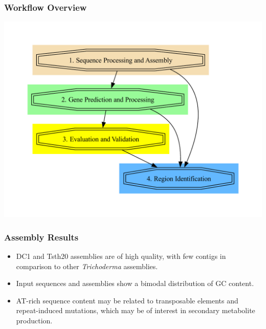 \documentclass[t]{beamer}
\begin{document}
\begin{frame}
	\frametitle{Workflow Overview}
	\centering
	\includegraphics[width=\textwidth]{../../working-thesis/figures/workflow-simple.pdf}
\end{frame}

\begin{frame}
	\frametitle{Assembly Results}
	\centering
	\vspace{0.5cm}
	\begin{itemize}
		\item DC1 and Tsth20 assemblies are of high quality, with few contigs in comparison to other \textit{Trichoderma} assemblies.
		\item Input sequences and assemblies show a bimodal distribution of GC content.
		\item AT-rich sequence content may be related to transposable elements and repeat-induced mutations, which may be of interest in secondary metabolite production.
	\end{itemize}
\end{frame}
\end{document}
